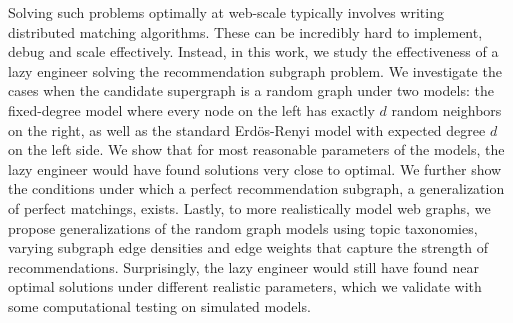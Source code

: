 Solving such problems optimally at web-scale typically involves
writing distributed matching algorithms.  These can be incredibly hard
to implement, debug and scale effectively.  Instead, in this work, we
study the effectiveness of a lazy engineer solving the recommendation
subgraph problem. We investigate the cases when the candidate
supergraph is a random graph under two models: the fixed-degree model
where every node on the left has exactly $d$ random neighbors on the
right, as well as the standard Erd\"{o}s-Renyi model with expected
degree $d$ on the left side. We show that for most reasonable
parameters of the models, the lazy engineer would have found solutions
very close to optimal. We further show the conditions under which a
perfect recommendation subgraph, a generalization of perfect
matchings, exists. Lastly, to more realistically model web graphs, we
propose generalizations of the random graph models using topic
taxonomies, varying subgraph edge densities and edge weights that
capture the strength of recommendations. Surprisingly, the lazy
engineer would still have found near optimal solutions under different
realistic parameters, which we validate with some computational
testing on simulated models.
\fi 
